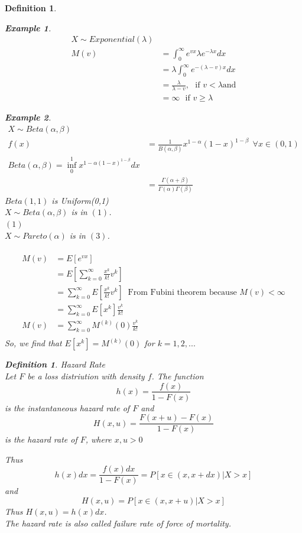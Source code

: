 \documentclass[11pt,a4paper,oneside]{article}\usepackage[]{graphicx}\usepackage[]{color}
\newtheorem{defi}[subsection]{Definition}
\newtheorem{exm}{Example}
\begin{document}
\begin{algin*}
\begin{defi}
\begin{exm}
\begin{align*}X\sim Exponential(\lambda)\\
M(v)&=\displaystyle\int_0^{\infty}e^{vx}\lambda e^{-\lambda x}dx\\
&=\lambda\int_0^{\infty}e^{-(\lambda-v)x}dx\\
&=\frac{\lambda}{\lambda-v},\ \ \ \text{if }  v<\lambda \text{and}\\
&=\infty\ \ \ \text{if } v\geq \lambda
\end{align*}
\end{exm}


\begin{exm}
\begin{align*}X\sim Beta(\alpha,\beta)\\
f(x)&=\frac{1}{B(\alpha,\beta)}x^{1-\alpha}(1-x)^{1-\beta}\ \ \forall x\in (0,1)\\
Beta(\alpha,\beta)=\inf_0^1x^{1-\alpha(1-x)^{1-\beta}}dx\\
&=\frac{\Gamma(\alpha+\beta)}{\Gamma(\alpha)\Gamma(\beta)}
\end{align*}
$Beta(1,1)$ is Uniform(0,1)\\
$X\sim Beta(\alpha,\beta)$ is in $(1)$.\\
$(1)$\\
$X\sim Pareto(\alpha)$ is in $(3)$.\\
\\
\begin{align*}
M(v)&=E[e^{vx}]\\
    &=E[\displaystyle\sum_{k=0}^{\infty}\frac{x^k}{k!}v^k]\\
    &=\displaystyle\sum_{k=0}^{\infty}E[\frac{x^k}{k!}v^k]\ \text{ From Fubini theorem because $M(v)<\infty$}\\
    &=\displaystyle\sum_{k=0}^{\infty}E[x^k]\frac{v^k}{k!}\\
M(v)&=\displaystyle\sum_{k=0}^{\infty}  M^{(k)}(0)\frac{v^k}{k!}\\
\end{align*}
So, we find that $E[x^k]=M^{(k)}(0)$ for $k=1,2,...$
\end{exm}



\begin{defi}Hazard Rate\\
Let $F$ be a loss distriution with density $f$. The function $$h(x)=\frac{f(x)}{1-F(x)}$$ is the instantaneous hazard rate of $F$ and $$H(x,u)=\frac{F(x+u)-F(x)}{1-F(x)}$$ is the hazard rate of $F$, where $x,u>0$
\end{defi}
Thus $$h(x)dx=\frac{f(x)dx}{1-F(x)}=P[x\in(x,x+dx)|X>x]$$ and 
$$H(x,u)=P[x\in(x,x+u)|X>x]$$
Thus $H(x,u)=h(x)dx$.\\
The hazard rate is also called failure rate of force of mortality.\\


\end{defi}
\end{algin*}
\end{document}
